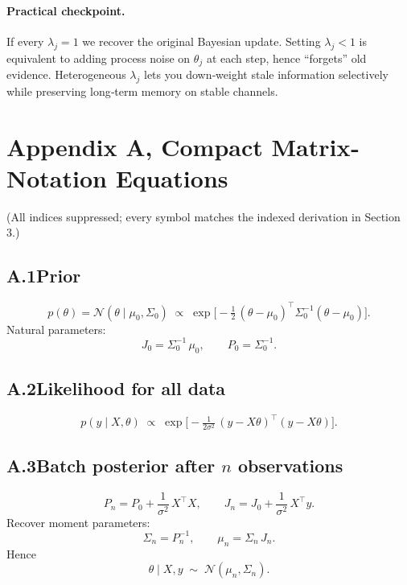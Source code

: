 \documentclass[11pt]{article}
\begin{document}
\paragraph{Practical checkpoint.}
If every \(\lambda_j=1\) we recover the original Bayesian update.  Setting \(\lambda_j<1\) is equivalent to adding process noise on \(\theta_j\) at each step, hence “forgets” old evidence.  Heterogeneous \(\lambda_j\) lets you down‐weight stale information selectively while preserving long‐term memory on stable channels.



\appendix
\section*{Appendix A, Compact Matrix‐Notation Equations}
(All indices suppressed; every symbol matches the indexed derivation in Section 3.)

\subsection*{A.1\quad Prior}
\begin{equation}\tag{A.1}
p(\theta)
= \mathcal{N}(\theta\mid \mu_0,\Sigma_0)
\;\propto\;
\exp\!\bigl[-\tfrac12\,
(\theta-\mu_0)^\top\Sigma_0^{-1}(\theta-\mu_0)\bigr].
\end{equation}
Natural parameters:
\[
J_0 = \Sigma_0^{-1}\,\mu_0,
\qquad
P_0 = \Sigma_0^{-1}.
\]

\subsection*{A.2\quad Likelihood for all data}
\begin{equation}\tag{A.2}
p(y\mid X,\theta)
\;\propto\;
\exp\!\bigl[-\tfrac1{2\sigma^2}\,
(y - X\theta)^\top(y - X\theta)\bigr].
\end{equation}

\subsection*{A.3\quad Batch posterior after \(n\) observations}
\begin{equation}\tag{A.3}
P_n = P_0 + \frac1{\sigma^2}\,X^\top X,
\qquad
J_n = J_0 + \frac1{\sigma^2}\,X^\top y.
\end{equation}
Recover moment parameters:
\[
\Sigma_n = P_n^{-1},
\qquad
\mu_n = \Sigma_n\,J_n.
\]
Hence
\begin{equation}\tag{A.4}
\theta\mid X,y \;\sim\; \mathcal{N}(\mu_n,\Sigma_n).
\end{equation}
\end{document}
